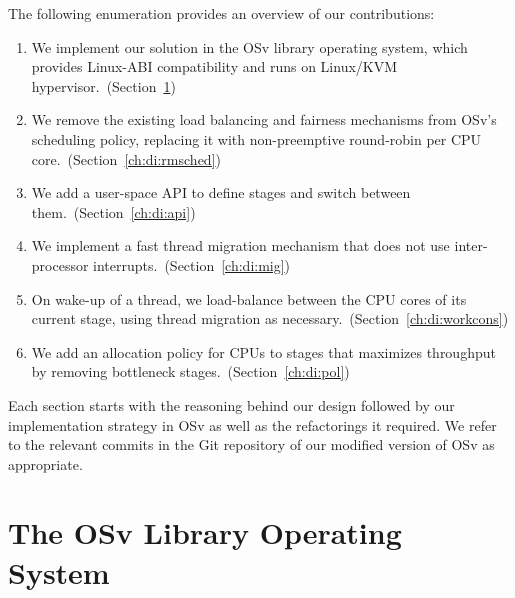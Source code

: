 \documentclass[12pt,a4paper]{book}
\begin{document}
The following enumeration provides an overview of our contributions:
\begin{enumerate}
    \item We implement our solution in the OSv library operating system, which provides Linux-ABI compatibility and runs on Linux/KVM hypervisor.~(Section~\ref{ch:di:osv})
    \item We remove the existing load balancing and fairness mechanisms from OSv's scheduling policy, replacing it with non-preemptive round-robin per CPU core.~(Section~\ref{ch:di:rmsched})
    \item We add a user-space API to define stages and switch between them.~(Section~\ref{ch:di:api})
    \item We implement a fast thread migration mechanism that does not use inter-processor interrupts.~(Section~\ref{ch:di:mig})
    \item On wake-up of a thread, we load-balance between the CPU cores of its current stage, using thread migration as necessary.~(Section~\ref{ch:di:workcons})
    \item We add an allocation policy for CPUs to stages that maximizes throughput by removing bottleneck stages.~(Section~\ref{ch:di:pol})
\end{enumerate}
Each section starts with the reasoning behind our design followed by our implementation strategy in OSv as well as the refactorings it required.
We refer to the relevant commits in the Git repository of our modified version of OSv as appropriate.

\section{The OSv Library Operating System}\label{ch:di:osv}
%
\end{document}
